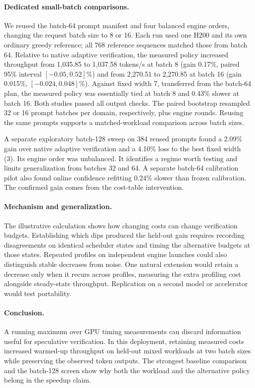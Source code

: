 \documentclass[11pt]{article}
\begin{document}
\paragraph{Dedicated small-batch comparisons.} We reused the batch-64 prompt manifest and four balanced engine orders, changing the request batch size to 8 or 16. Each run used one H200 and its own ordinary greedy reference; all 768 reference sequences matched those from batch 64. Relative to native adaptive verification, the measured policy increased throughput from 1,035.85 to 1,037.58 tokens/s at batch 8 (gain 0.17\%, paired 95\% interval $[-0.05,0.52]\%$) and from 2,270.51 to 2,270.85 at batch 16 (gain 0.015\%, $[-0.024,0.048]\%$). Against fixed width 7, transferred from the batch-64 plan, the measured policy was essentially tied at batch 8 and 0.43\% slower at batch 16. Both studies passed all output checks. The paired bootstrap resampled 32 or 16 prompt batches per domain, respectively, plus engine rounds. Reusing the same prompts supports a matched-workload comparison across batch sizes.

A separate exploratory batch-128 sweep on 384 reused prompts found a 2.09\% gain over native adaptive verification and a 4.10\% loss to the best fixed width (3). Its engine order was unbalanced. It identifies a regime worth testing and limits generalization from batches 32 and 64. A separate batch-64 calibration pilot also found online confidence refitting 0.24\% slower than frozen calibration. The confirmed gain comes from the cost-table intervention.

\paragraph{Mechanism and generalization.} The illustrative calculation shows how changing costs can change verification budgets. Establishing which dips produced the held-out gain requires recording disagreements on identical scheduler states and timing the alternative budgets at those states. Repeated profiles on independent engine launches could also distinguish stable decreases from noise. One natural extension would retain a decrease only when it recurs across profiles, measuring the extra profiling cost alongside steady-state throughput. Replication on a second model or accelerator would test portability.

\paragraph{Conclusion.} A running maximum over GPU timing measurements can discard information useful for speculative verification. In this deployment, retaining measured costs increased warmed-up throughput on held-out mixed workloads at two batch sizes while preserving the observed token outputs. The strongest baseline comparison and the batch-128 screen show why both the workload and the alternative policy belong in the speedup claim.
\end{document}
